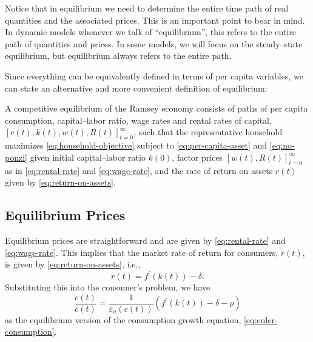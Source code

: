 \documentclass[\topdir/lecture\_notes.tex]{subfiles}
\begin{document}
Notice that in equilibrium we need to determine the entire time path of real quantities and the associated prices.
This is an important point to bear in mind.
In dynamic models whenever we talk of ``equilibrium'', this refers to the entire path of quantities and prices.
In some models, we will focus on the steady--state equilibrium, but equilibrium always refers to the entire path.

Since everything can be equivalently defined in terms of per capita variables, we can state an alternative and more convenient definition of equilibrium:

\begin{defn}\label{def:competitive-equilibrium-2}
  A competitive equilibrium of the Ramsey economy consists of paths of per capita consumption, capital--labor ratio, wage rates and rental rates of capital, $[c(t), k(t), w(t), R(t)]_{t=0}^{\infty}$, such that the representative household maximizes \eqref{eq:household-objective} subject to \eqref{eq:per-capita-asset} and \eqref{eq:no-ponzi} given initial capital--labor ratio $k(0)$, factor prices $[w(t), R(t)]_{t=0}^{\infty}$ as in \eqref{eq:rental-rate} and \eqref{eq:wage-rate}, and the rate of return on assets $r(t)$ given by \eqref{eq:return-on-assets}.
\end{defn}

\subsection{Equilibrium Prices}
Equilibrium prices are straightforward and are given by \eqref{eq:rental-rate} and \eqref{eq:wage-rate}. This implies that the market rate of return for consumers, $r(t)$, is given by \eqref{eq:return-on-assets}, i.e.,
\[
  r(t)=f^{\prime}(k(t))-\delta.
\]
Substituting this into the consumer's problem, we have
\begin{equation}
  \frac{\dot{c}(t)}{c(t)}=\frac{1}{\varepsilon_{u}(c(t))}\left(f^{\prime}(k(t))-\delta-\rho\right)
  \label{eq:equilibrium-euler}
\end{equation}
as the equilibrium version of the consumption growth equation, \eqref{eq:euler-consumption}.
\end{document}
